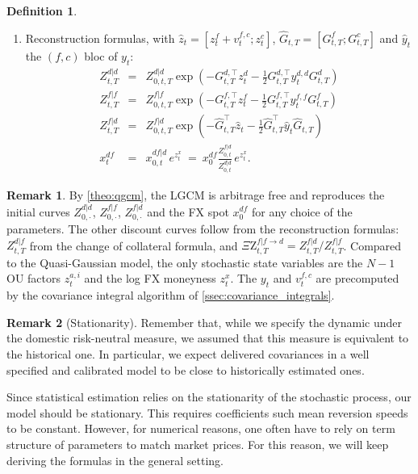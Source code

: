\documentclass[11pt,english]{amsart}
\newcommand{\QZ}{{\Xi\mathrm{Z}}}
\theoremstyle{definition}
\newtheorem{defi}{Definition}
\newtheorem{rema}{Remark}
\begin{document}
\begin{defi}
\begin{enumerate}
\begin{eqnarray}
\end{eqnarray}
\item Reconstruction formulas, with $\hat{z}_t = [z^f_t + v^{f,c}_t ; z^c_t]$, $\hat{G}_{t,T} = [G^f_{t,T};G^c_{t,T}]$ and $\hat{y}_t$ the $(f,c)$ bloc of $y_t$:
\begin{eqnarray}
  Z^{d|d}_{t,T}  &=& Z^{d|d}_{0,t,T} \exp\left( -G^{d,\top}_{t,T} z^{d}_t -\frac{1}{2} G^{d,\top}_{t,T}  y^{d,d}_t G^{d}_{t,T} \right) \\
  Z^{f|f}_{t,T}  &=& Z^{f|f}_{0,t,T} \exp\left( -G^{f,\top}_{t,T} z^{f}_t -\frac{1}{2} G^{f,\top}_{t,T}  y^{f,f}_t G^{f}_{t,T} \right) \\
  Z^{f|d}_{t,T}  &=& Z^{f|d}_{0,t,T} \exp\left( -\hat{G}^{\top}_{t,T} \hat{z}_t - \frac{1}{2} \hat{G}^{\top}_{t,T}  \hat{y}_t \hat{G}_{t,T} \right) \\
  x^{df}_{t}  &=& x^{df|d}_{0,t} \, e^{z^x_t} ~=~ x^{df}_0 \frac{Z^{f|d}_{0,t}}{Z^{d|d}_{0,t}} \, e^{z^x_t} .
\end{eqnarray}
\end{enumerate}
\end{defi}

\begin{rema}
By \autoref{theo:qgcm}, the LGCM is arbitrage free and reproduces the initial curves $Z^{d|d}_{0,\cdot}$, $Z^{f|f}_{0,\cdot}$, $Z^{f|d}_{0,\cdot}$ and the FX spot $x^{df}_0$ for any choice of the parameters. The other discount curves follow from the reconstruction formulas: $Z^{d|f}_{t,T}$ from the change of collateral formula, and $\QZ^{f|f\to d}_{t,T} = Z^{f|d}_{t,T}/Z^{f|f}_{t,T}$. Compared to the Quasi-Gaussian model, the only stochastic state variables are the $N-1$ OU factors $z^{a,i}_t$ and the log FX moneyness $z^x_t$. The $y_t$ and $v^{f,c}_t$ are precomputed by the covariance integral algorithm of \autoref{ssec:covariance_integrals}.
\end{rema}


\begin{rema}[Stationarity]
Remember that, while we specify the dynamic under the domestic risk-neutral measure, we assumed that this measure is equivalent to the historical one. In particular, we expect delivered covariances in a well specified and calibrated model to be close to historically estimated ones.

Since statistical estimation relies on the stationarity of the stochastic process, our model should be stationary. This requires coefficients such mean reversion speeds to be constant. However, for numerical reasons, one often have to rely on term structure of parameters to match market prices. For this reason, we will keep deriving the formulas in the general setting.
\end{rema}
\end{document}
